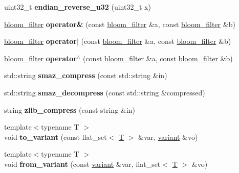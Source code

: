 \begin{DoxyCompactItemize}
uint32\+\_\+t {\bfseries endian\+\_\+reverse\+\_\+u32} (uint32\+\_\+t x)
\item 
\mbox{\label{namespacefc_a8ccde20932f2d4857aa61b2702a78255}} 
\mbox{\hyperlink{classfc_1_1bloom__filter}{bloom\+\_\+filter}} {\bfseries operator\&} (const \mbox{\hyperlink{classfc_1_1bloom__filter}{bloom\+\_\+filter}} \&a, const \mbox{\hyperlink{classfc_1_1bloom__filter}{bloom\+\_\+filter}} \&b)
\item 
\mbox{\label{namespacefc_a55c88e95ca029e7156bc0c883a280eb8}} 
\mbox{\hyperlink{classfc_1_1bloom__filter}{bloom\+\_\+filter}} {\bfseries operator$\vert$} (const \mbox{\hyperlink{classfc_1_1bloom__filter}{bloom\+\_\+filter}} \&a, const \mbox{\hyperlink{classfc_1_1bloom__filter}{bloom\+\_\+filter}} \&b)
\item 
\mbox{\label{namespacefc_ab64622edd2e839b6ed7a293a08698a80}} 
\mbox{\hyperlink{classfc_1_1bloom__filter}{bloom\+\_\+filter}} {\bfseries operator$^\wedge$} (const \mbox{\hyperlink{classfc_1_1bloom__filter}{bloom\+\_\+filter}} \&a, const \mbox{\hyperlink{classfc_1_1bloom__filter}{bloom\+\_\+filter}} \&b)
\item 
\mbox{\label{namespacefc_a207783e19dff234bb16f308f95feb974}} 
std\+::string {\bfseries smaz\+\_\+compress} (const std\+::string \&in)
\item 
\mbox{\label{namespacefc_aafe89447c710df2a341af679383d99d4}} 
std\+::string {\bfseries smaz\+\_\+decompress} (const std\+::string \&compressed)
\item 
\mbox{\label{namespacefc_a5067fd64dc65a9185a024b76dd0272db}} 
string {\bfseries zlib\+\_\+compress} (const string \&in)
\item 
\mbox{\label{namespacefc_a5f7675cc1fd6291bb7b63a7978ff575c}} 
{\footnotesize template$<$typename T $>$ }\\void {\bfseries to\+\_\+variant} (const flat\+\_\+set$<$ \mbox{\hyperlink{struct_t}{T}} $>$ \&var, \mbox{\hyperlink{classfc_1_1variant}{variant}} \&vo)
\item 
\mbox{\label{namespacefc_a622b590205f54cf63e076aa49f9d8743}} 
{\footnotesize template$<$typename T $>$ }\\void {\bfseries from\+\_\+variant} (const \mbox{\hyperlink{classfc_1_1variant}{variant}} \&var, flat\+\_\+set$<$ \mbox{\hyperlink{struct_t}{T}} $>$ \&vo)

\end{DoxyCompactItemize}
